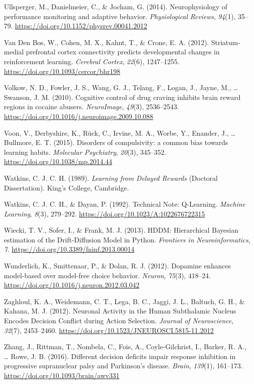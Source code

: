 \documentclass[12pt,openany]{book}
\theoremstyle{definition}
\theoremstyle{definition}
\theoremstyle{definition}
\theoremstyle{remark}
\begin{document}
\hypertarget{ref-Ullsperger2014}{}
Ullsperger, M., Danielmeier, C., \& Jocham, G. (2014). Neurophysiology
of performance monitoring and adaptive behavior. \emph{Physiological
Reviews}, \emph{94}(1), 35--79.
\url{https://doi.org/10.1152/physrev.00041.2012}

\hypertarget{ref-VandenBos2012}{}
Van Den Bos, W., Cohen, M. X., Kahnt, T., \& Crone, E. A. (2012).
Striatum-medial prefrontal cortex connectivity predicts developmental
changes in reinforcement learning. \emph{Cerebral Cortex}, \emph{22}(6),
1247--1255. \url{https://doi.org/10.1093/cercor/bhr198}

\hypertarget{ref-Volkow2010}{}
Volkow, N. D., Fowler, J. S., Wang, G. J., Telang, F., Logan, J., Jayne,
M., \ldots{} Swanson, J. M. (2010). Cognitive control of drug craving
inhibits brain reward regions in cocaine abusers. \emph{NeuroImage},
\emph{49}(3), 2536--2543.
\url{https://doi.org/10.1016/j.neuroimage.2009.10.088}

\hypertarget{ref-Voon2015}{}
Voon, V., Derbyshire, K., Rück, C., Irvine, M. A., Worbe, Y., Enander,
J., \ldots{} Bullmore, E. T. (2015). Disorders of compulsivity: a common
bias towards learning habits. \emph{Molecular Psychiatry}, \emph{20}(3),
345--352. \url{https://doi.org/10.1038/mp.2014.44}

\hypertarget{ref-Watkins1989}{}
Watkins, C. J. C. H. (1989). \emph{Learning from Delayed Rewards}
(Doctoral Dissertation). King's College, Cambridge.

\hypertarget{ref-Watkins1992}{}
Watkins, C. J. C. H., \& Dayan, P. (1992). Technical Note: Q-Learning.
\emph{Machine Learning}, \emph{8}(3), 279--292.
\url{https://doi.org/10.1023/A:1022676722315}

\hypertarget{ref-Wiecki2013}{}
Wiecki, T. V., Sofer, I., \& Frank, M. J. (2013). HDDM: Hierarchical
Bayesian estimation of the Drift-Diffusion Model in Python.
\emph{Frontiers in Neuroinformatics}, \emph{7}.
\url{https://doi.org/10.3389/fninf.2013.00014}

\hypertarget{ref-Wunderlich2012c}{}
Wunderlich, K., Smittenaar, P., \& Dolan, R. J. (2012). Dopamine
enhances model-based over model-free choice behavior. \emph{Neuron},
\emph{75}(3), 418--24.
\url{https://doi.org/10.1016/j.neuron.2012.03.042}

\hypertarget{ref-Zaghloul2012}{}
Zaghloul, K. A., Weidemann, C. T., Lega, B. C., Jaggi, J. L., Baltuch,
G. H., \& Kahana, M. J. (2012). Neuronal Activity in the Human
Subthalamic Nucleus Encodes Decision Conflict during Action Selection.
\emph{Journal of Neuroscience}, \emph{32}(7), 2453--2460.
\url{https://doi.org/10.1523/JNEUROSCI.5815-11.2012}

\hypertarget{ref-Zhang2016}{}
Zhang, J., Rittman, T., Nombela, C., Fois, A., Coyle-Gilchrist, I.,
Barker, R. A., \ldots{} Rowe, J. B. (2016). Different decision deficits
impair response inhibition in progressive supranuclear palsy and
Parkinson's disease. \emph{Brain}, \emph{139}(1), 161--173.
\url{https://doi.org/10.1093/brain/awv331}
\end{document}
